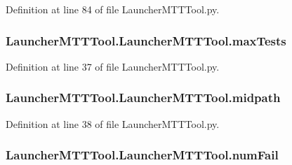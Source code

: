 Definition at line 84 of file Launcher\-M\-T\-T\-Tool.\-py.

\hypertarget{class_launcher_m_t_t_tool_1_1_launcher_m_t_t_tool_aa8e59ca462ace6b189cd849a08afa639}{
\subsubsection[{max\-Tests}]{\setlength{\rightskip}{0pt plus 5cm}Launcher\-M\-T\-T\-Tool.\-Launcher\-M\-T\-T\-Tool.\-max\-Tests}}\label{class_launcher_m_t_t_tool_1_1_launcher_m_t_t_tool_aa8e59ca462ace6b189cd849a08afa639}


Definition at line 37 of file Launcher\-M\-T\-T\-Tool.\-py.

\hypertarget{class_launcher_m_t_t_tool_1_1_launcher_m_t_t_tool_a37f255feb0dac2f1eb0e6eff2746bd7b}{
\subsubsection[{midpath}]{\setlength{\rightskip}{0pt plus 5cm}Launcher\-M\-T\-T\-Tool.\-Launcher\-M\-T\-T\-Tool.\-midpath}}\label{class_launcher_m_t_t_tool_1_1_launcher_m_t_t_tool_a37f255feb0dac2f1eb0e6eff2746bd7b}


Definition at line 38 of file Launcher\-M\-T\-T\-Tool.\-py.

\hypertarget{class_launcher_m_t_t_tool_1_1_launcher_m_t_t_tool_a17fe6e6f8981cc1f7cd1953cac37668a}{
\subsubsection[{num\-Fail}]{\setlength{\rightskip}{0pt plus 5cm}Launcher\-M\-T\-T\-Tool.\-Launcher\-M\-T\-T\-Tool.\-num\-Fail}}\label{class_launcher_m_t_t_tool_1_1_launcher_m_t_t_tool_a17fe6e6f8981cc1f7cd1953cac37668a}


